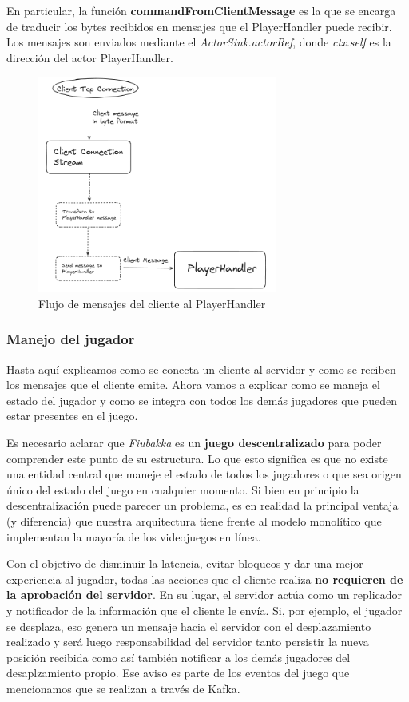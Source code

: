 En particular, la función \textbf{commandFromClientMessage} es la que se encarga de traducir los bytes recibidos
en mensajes que el PlayerHandler puede recibir. Los mensajes son enviados mediante el \textit{ActorSink.actorRef}, donde
\textit{ctx.self} es la dirección del actor PlayerHandler.

\begin{figure}[htbp]
    \centering
    \includegraphics[width=0.7\textwidth]{../assets/player-handler-client-flow.png}
    \caption{Flujo de mensajes del cliente al PlayerHandler}
\end{figure}

\subsubsection{Manejo del jugador}

\noindent Hasta aquí explicamos como se conecta un cliente al servidor y como se reciben los mensajes que el cliente emite.
Ahora vamos a explicar como se maneja el estado del jugador y como se integra con todos los demás jugadores que pueden estar
presentes en el juego.

Es necesario aclarar que \textit{Fiubakka} es un \textbf{juego descentralizado} para poder comprender este punto de su estructura. Lo que esto significa es que no existe una
entidad central que maneje el estado de todos los jugadores o que sea origen único del estado del juego en cualquier momento.
Si bien en principio la descentralización puede parecer un problema, es en realidad la principal ventaja (y diferencia) que nuestra arquitectura tiene
frente al modelo monolítico que implementan la mayoría de los videojuegos en línea.

Con el objetivo de disminuir la latencia, evitar bloqueos y dar una mejor experiencia al jugador, todas las acciones que el cliente
realiza \textbf{no requieren de la aprobación del servidor}. En su lugar, el servidor actúa como un replicador y notificador de la información
que el cliente le envía. Si, por ejemplo, el jugador se desplaza, eso genera un mensaje hacia el servidor con el desplazamiento realizado y será luego
responsabilidad del servidor tanto persistir la nueva posición recibida como así también notificar a los demás jugadores del desaplzamiento propio.
Ese aviso es parte de los eventos del juego que mencionamos que se realizan a través de Kafka.

